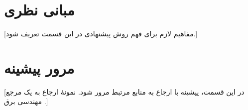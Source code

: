 \section{مبانی نظری}
[مفاهیم لازم برای فهم روش پیشنهادی در این قسمت تعریف شود.]

\section{مرور پیشینه}
[در این قسمت، پیشینه با ارجاع به منابع مرتبط مرور شود. نمونۀ ارجاع به یک مرجع مهندسی برق \cite{oppenheim2010}.]
